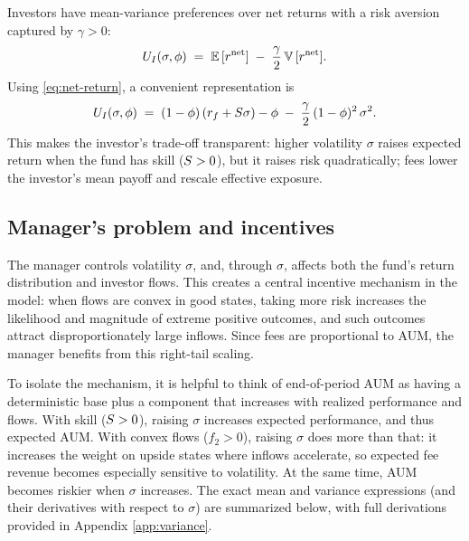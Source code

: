 Investors have mean-variance preferences over net returns with a risk
aversion captured by \(\gamma>0\): \begin{equation}
\label{eq:UI}
    U_I(\sigma,\phi)\;=\;{\mathbb{E}}\,[r^{\text{net}}] \;-\; \frac{\gamma}{2}\,{\mathbb{V}}\,[r^{\text{net}}].
\end{equation} Using \eqref{eq:net-return}, a convenient representation
is \begin{equation}
\label{eq:UI-expanded}
U_I(\sigma,\phi) \;=\; (1-\phi)\,(r_f+S\sigma) - \phi \;-\; \frac{\gamma}{2}\,(1-\phi)^2\,\sigma^2.
\end{equation} This makes the investor's trade-off transparent: higher
volatility \(\sigma\) raises expected return when the fund has skill
(\(S>0\)), but it raises risk quadratically; fees lower the
investor's mean payoff and rescale effective exposure.

\subsection{Manager's problem and incentives}\label{sec:manager}

The manager controls volatility \(\sigma\), and, through \(\sigma\),
affects both the fund's return distribution and investor flows. This
creates a central incentive mechanism in the model: when flows are
convex in good states, taking more risk increases the likelihood and
magnitude of extreme positive outcomes, and such outcomes attract
disproportionately large inflows. Since fees are proportional to AUM,
the manager benefits from this right-tail scaling.

To isolate the mechanism, it is helpful to think of end-of-period AUM as
having a deterministic base plus a component that increases with
realized performance and flows. With skill (\(S>0\)), raising
\(\sigma\) increases expected performance, and thus expected AUM. With
convex flows (\(f_2>0\)), raising \(\sigma\) does more than that: it
increases the weight on upside states where inflows accelerate, so
expected fee revenue becomes especially sensitive to volatility. At the
same time, AUM becomes riskier when \(\sigma\) increases. The exact mean
and variance expressions (and their derivatives with respect to
\(\sigma\)) are summarized below, with full derivations provided in
Appendix \ref{app:variance}.

